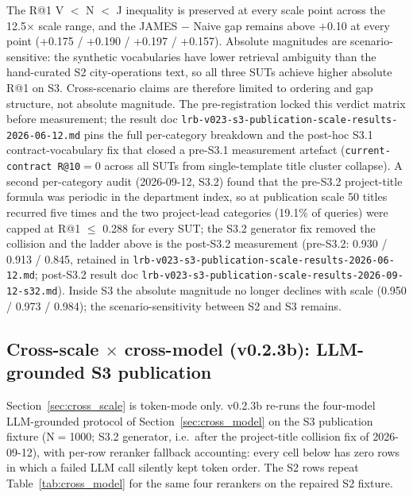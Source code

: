\documentclass[11pt,a4paper]{article}
\begin{document}
The R@1 V $<$ N $<$ J inequality is preserved at every scale point across the 12.5$\times$ scale range, and the JAMES $-$ Naive gap remains above $+$0.10 at every point (+0.175 / +0.190 / +0.197 / +0.157). Absolute magnitudes are scenario-sensitive: the synthetic vocabularies have lower retrieval ambiguity than the hand-curated S2 city-operations text, so all three SUTs achieve higher absolute R@1 on S3. Cross-scenario claims are therefore limited to ordering and gap structure, not absolute magnitude. The pre-registration locked this verdict matrix before measurement; the result doc \texttt{lrb-v023-s3-publication-scale-results-2026-06-12.md} pins the full per-category breakdown and the post-hoc S3.1 contract-vocabulary fix that closed a pre-S3.1 measurement artefact (\texttt{current-contract R@10}$=$0 across all SUTs from single-template title cluster collapse). A second per-category audit (2026-09-12, S3.2) found that the pre-S3.2 project-title formula was periodic in the department index, so at publication scale 50 titles recurred five times and the two project-lead categories (19.1\% of queries) were capped at R@1 $\le$ 0.288 for every SUT; the S3.2 generator fix removed the collision and the ladder above is the post-S3.2 measurement (pre-S3.2: 0.930 / 0.913 / 0.845, retained in \texttt{lrb-v023-s3-publication-scale-results-2026-06-12.md}; post-S3.2 result doc \texttt{lrb-v023-s3-publication-scale-results-2026-09-12-s32.md}). Inside S3 the absolute magnitude no longer declines with scale (0.950 / 0.973 / 0.984); the scenario-sensitivity between S2 and S3 remains.

\subsection{Cross-scale $\times$ cross-model (v0.2.3b): LLM-grounded S3 publication}
\label{sec:cross_scale_model}

Section~\ref{sec:cross_scale} is token-mode only. v0.2.3b re-runs the four-model LLM-grounded protocol of Section~\ref{sec:cross_model} on the S3 publication fixture (N$=$1000; S3.2 generator, i.e.\ after the project-title collision fix of 2026-09-12), with per-row reranker fallback accounting: every cell below has zero rows in which a failed LLM call silently kept token order. The S2 rows repeat Table~\ref{tab:cross_model} for the same four rerankers on the repaired S2 fixture.
\end{document}
